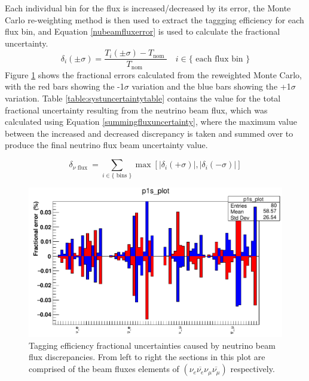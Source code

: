 Each individual bin for the flux is increased/decreased by its error, the Monte Carlo re-weighting method is then used to extract the taggging efficiency for each flux bin, and Equation \eqref{nubeamfluxerror} is used to calculate the fractional uncertainty.
\newline
\begin{equation}
    \delta_{i}(\pm \sigma)=\frac{T_{i}(\pm \sigma)-T_{\text {nom }}}{T_{\text {nom }}} \quad i \in\{\text { each flux bin }\}
\label{nubeamfluxerror}
\end{equation}
\newline
Figure \ref{fig:fluxuncertainty} shows the fractional errors calculated from the reweighted Monte Carlo, with the red bars showing the -1$\sigma$ variation and the blue bars showing the +1$\sigma$ variation. Table \ref{table:systuncertaintytable} contains the value for the total fractional uncertainty resulting from the neutrino beam flux, which was calculated using Equation \eqref{summingfluxuncertainty}, where the maximum value between the increased and decreased discrepancy is taken and summed over to produce the final neutrino flux beam uncertainty value.
\newline

\begin{equation}
    \delta_{\nu \text { flux }}=\sum_{i \in\{\text { bins }\}} \max \left[\left|\delta_{i}(+\sigma)\right|,\left|\delta_{i}(-\sigma)\right|\right]
 \label{summingfluxuncertainty}   
\end{equation}

\begin{figure}[h!]
\includegraphics[scale=0.4]{Figures/flux_uncertainty.png}
\caption{Tagging efficiency fractional uncertainties caused by neutrino beam flux discrepancies. From left to right the sections in this plot are comprised of the beam fluxes elements of $\left(\nu_{e} \overline{\nu_{e}} \nu_{\mu} \overline{\nu_{\mu}}\right)$ respectively.}
\label{fig:fluxuncertainty}
\end{figure}

